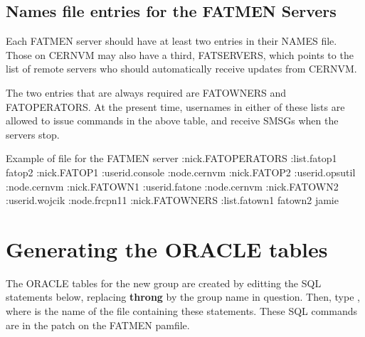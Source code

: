 \subsection{Names file entries for the FATMEN Servers}
\par
Each FATMEN server should have at least two entries in their NAMES file.
Those on CERNVM may also have a third, FATSERVERS, which points to
the list of remote servers who should automatically receive updates
from CERNVM.
\par
The two entries that are always required are FATOWNERS and FATOPERATORS.
At the present time, usernames in either of these lists are allowed
to issue commands in the above table, and receive SMSGs when the servers
stop.
\begin{XMPt}{Example of  file for the FATMEN server}
:nick.FATOPERATORS                :list.fatop1 fatop2
:nick.FATOP1                      :userid.console
                                  :node.cernvm
:nick.FATOP2                      :userid.opsutil
                                  :node.cernvm
:nick.FATOWN1                     :userid.fatone
                                  :node.cernvm
:nick.FATOWN2                     :userid.wojcik
                                  :node.frcpn11
:nick.FATOWNERS                   :list.fatown1 fatown2 jamie
\end{XMPt}

\section{Generating the ORACLE tables}
\par
{}
The ORACLE tables for the new group are created by editting the
SQL statements below, replacing {\bf throng}
by the group name in question. Then, type
, where  is
the name of the file containing these statements.
These SQL commands are in the patch  on the FATMEN pamfile.
 
